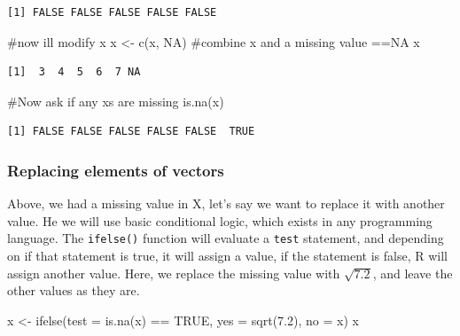 \documentclass[
  letterpaper,
  DIV=11,
  numbers=noendperiod]{scrreprt}
\newenvironment{Shaded}{\begin{snugshade}}{\end{snugshade}}
\newcommand{\AttributeTok}[1]{\textcolor[rgb]{0.40,0.45,0.13}{#1}}
\newcommand{\CommentTok}[1]{\textcolor[rgb]{0.37,0.37,0.37}{#1}}
\newcommand{\ConstantTok}[1]{\textcolor[rgb]{0.56,0.35,0.01}{#1}}
\newcommand{\FloatTok}[1]{\textcolor[rgb]{0.68,0.00,0.00}{#1}}
\newcommand{\FunctionTok}[1]{\textcolor[rgb]{0.28,0.35,0.67}{#1}}
\newcommand{\NormalTok}[1]{\textcolor[rgb]{0.00,0.23,0.31}{#1}}
\newcommand{\OtherTok}[1]{\textcolor[rgb]{0.00,0.23,0.31}{#1}}
\newcommand{\SpecialCharTok}[1]{\textcolor[rgb]{0.37,0.37,0.37}{#1}}
\begin{document}
\begin{verbatim}
[1] FALSE FALSE FALSE FALSE FALSE
\end{verbatim}

\begin{Shaded}
\begin{Highlighting}[]
\CommentTok{\#now i\textquotesingle{}ll modify x}
\NormalTok{x }\OtherTok{\textless{}{-}} \FunctionTok{c}\NormalTok{(x, }\ConstantTok{NA}\NormalTok{) }\CommentTok{\#combine x and a missing value ==NA}
\NormalTok{x}
\end{Highlighting}
\end{Shaded}

\begin{verbatim}
[1]  3  4  5  6  7 NA
\end{verbatim}

\begin{Shaded}
\begin{Highlighting}[]
\CommentTok{\#Now ask if any x\textquotesingle{}s are missing}
\FunctionTok{is.na}\NormalTok{(x)}
\end{Highlighting}
\end{Shaded}

\begin{verbatim}
[1] FALSE FALSE FALSE FALSE FALSE  TRUE
\end{verbatim}

\hypertarget{replacing-elements-of-vectors}{%
\subsubsection{Replacing elements of
vectors}\label{replacing-elements-of-vectors}}

Above, we had a missing value in X, let's say we want to replace it with
another value. He we will use basic conditional logic, which exists in
any programming language. The \texttt{ifelse()} function will evaluate a
\texttt{test} statement, and depending on if that statement is true, it
will assign a value, if the statement is false, R will assign another
value. Here, we replace the missing value with \(\sqrt{7.2}\), and leave
the other values as they are.

\begin{Shaded}
\begin{Highlighting}[]
\NormalTok{x }\OtherTok{\textless{}{-}} \FunctionTok{ifelse}\NormalTok{(}\AttributeTok{test =} \FunctionTok{is.na}\NormalTok{(x) }\SpecialCharTok{==} \ConstantTok{TRUE}\NormalTok{,}
            \AttributeTok{yes =}  \FunctionTok{sqrt}\NormalTok{(}\FloatTok{7.2}\NormalTok{),}
            \AttributeTok{no =}\NormalTok{  x)}
\NormalTok{x}
\end{Highlighting}
\end{Shaded}
\end{document}

